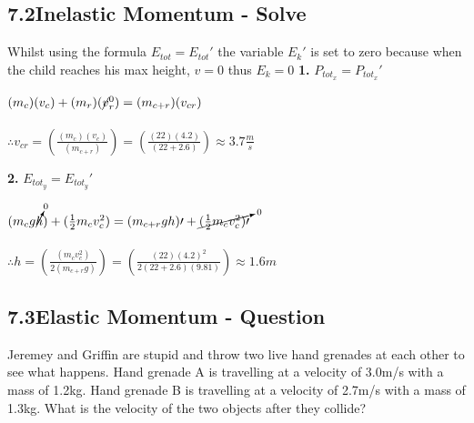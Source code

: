 \documentclass{article}
\begin{document}
\begin{adjustwidth}{1cm}{0pt}
    \subsection*{7.2\hspace*{0.5cm}Inelastic Momentum - Solve}
    Whilst using the formula $E_{tot} = E_{tot}\prime$ the variable $E_{k}\prime$ is set to zero because when the child reaches his max height, $v = 0$ thus $E_{k} = 0$\newline\newline
    \textbf{1.} $P_{tot_{x}} = P_{tot_{x}}\prime$ \\
    \begin{adjustwidth}{0.6cm}{0pt}
        $(m_{c})({v}_{c}) + (m_{r})(\cancel{v}_{r}^0) = (m_{c + r})(v_{cr})$ \\\\
        $\therefore v_{cr} = \left(\frac{(m_{c})(v_{c})}{(m_{c + r})}\right) = \left(\frac{(22)(4.2)}{(22 + 2.6)}\right) \approx 3.7\frac{m}{s}$
    \end{adjustwidth}\vspace*{15pt}
    \textbf{2.} $E_{tot_{y}} = E_{tot_{y}}\prime$ \\
    \begin{adjustwidth}{0.6cm}{0pt}
        $(m_{c}g\cancelto{0}{h}) + (\frac{1}{2}m_{c}v_{c}^2) = (m_{c + r}gh)\prime + \cancelto{0}{(\frac{1}{2}m_{c}v_{c}^2)\prime}$ \\\\
        $\therefore h = \left(\frac{(m_{c}v_{c}^2)}{2(m_{c+r}g)}\right) = \left(\frac{(22){(4.2)}^2}{2(22 + 2.6)(9.81)}\right) \approx 1.6m$
    \end{adjustwidth}\vspace*{15pt}

    \subsection*{7.3\hspace*{0.5cm}Elastic Momentum - Question}
    Jeremey and Griffin are stupid and throw two live hand grenades at each other to see what happens. Hand grenade A is travelling at a velocity of 3.0m/s with a mass of 1.2kg. Hand grenade B is travelling at a velocity of 2.7m/s with a mass of 1.3kg. What is the velocity of the two objects after they collide?

\end{adjustwidth}
\end{document}
